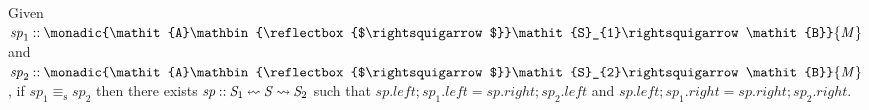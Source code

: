 \documentclass[runningheads]{llncs}
\newcommand{\Conid}[1]{\mathit{#1}}
\newcommand{\Varid}[1]{\mathit{#1}}
\begin{document}
\begin{theorem}\label{thm:span-equivalence}
 Given \ensuremath{\Varid{sp}_{\mathrm{1}}\mathbin{::}\monadic{\Conid{A}\mathbin{\reflectbox{$\rightsquigarrow$}}\Conid{S}_{1}\rightsquigarrow\Conid{B}}{\Conid{M}}}
  and \ensuremath{\Varid{sp}_{\mathrm{2}}\mathbin{::}\monadic{\Conid{A}\mathbin{\reflectbox{$\rightsquigarrow$}}\Conid{S}_{2}\rightsquigarrow\Conid{B}}{\Conid{M}}}, if \ensuremath{\Varid{sp}_{\mathrm{1}}\equiv_{\mathrm{s}} \Varid{sp}_{\mathrm{2}}} then
  there exists \ensuremath{\Varid{sp}\mathbin{::}\Conid{S}_{1}\mathbin{{\reflectbox{$\rightsquigarrow$}}}\Conid{S}\mathbin{{\rightsquigarrow}}\Conid{S}_{2}} such
  that \ensuremath{\Varid{sp}\mathord{.}\Varid{left}\mathbin{;}\Varid{sp}_{\mathrm{1}}\mathord{.}\Varid{left}\mathrel{=}\Varid{sp}\mathord{.}\Varid{right}\mathbin{;}\Varid{sp}_{\mathrm{2}}\mathord{.}\Varid{left}} and \ensuremath{\Varid{sp}\mathord{.}\Varid{left}\mathbin{;}\Varid{sp}_{\mathrm{1}}\mathord{.}\Varid{right}\mathrel{=}\Varid{sp}\mathord{.}\Varid{right}\mathbin{;}\Varid{sp}_{\mathrm{2}}\mathord{.}\Varid{right}}.
\end{theorem}
\end{document}
